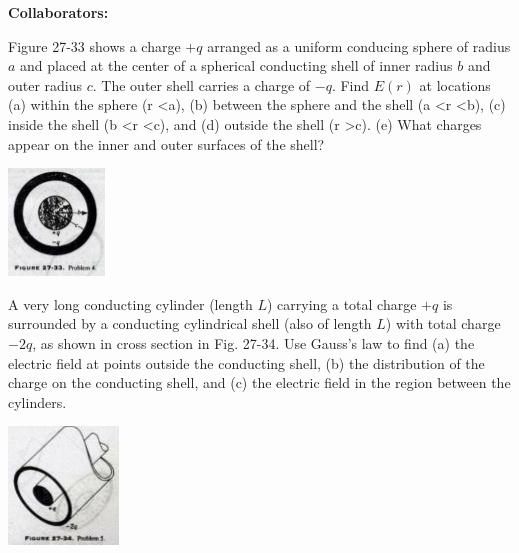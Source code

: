 \documentclass[11pt,letterpaper,boxed]{hmcpset}
\begin{document}
	
	\noindent\textbf{Collaborators:} 
	
	
	\begin{problem}[HRK P27.4] 
		Figure 27-33 shows a charge $+q$ arranged as a uniform conducing sphere of radius $a$ and placed at the center of a spherical conducting shell of inner radius $b$ and outer radius $c$. The outer shell carries a charge of $-q$. Find $E(r)$ at locations (a) within the sphere (r \textless a), (b) between the sphere and the shell (a \textless r \textless b), (c) inside the shell (b \textless r \textless c), and (d) outside the shell (r \textgreater c). (e) What charges appear on the inner and outer surfaces of the shell?
		\begin{center}
		\includegraphics[scale=.7]{fig2733.jpg}
		\end{center}
		
	\end{problem}
	
	\begin{solution}
		\vfill
	\end{solution}
	\newpage

	\begin{problem}[HRK P27.5] 
A very long conducting cylinder (length $L$) carrying a total charge $+q$ is surrounded by a conducting cylindrical shell (also of length $L$) with total charge $-2q$, as shown in cross section in Fig. 27-34. Use Gauss's law to find (a) the electric field at points outside the conducting shell, (b) the distribution of the charge on the conducting shell, and (c) the electric field in the region between the cylinders.	
	\begin{center}
			\includegraphics[scale=.7]{fig2734.jpg}
	\end{center}
	\end{problem}
	\begin{solution}
		\vfill
	\end{solution}
	\newpage
\end{document}
